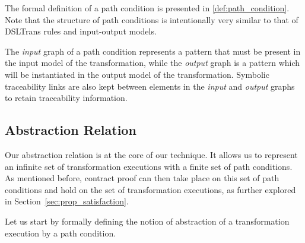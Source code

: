 The formal definition of a path condition is presented in \cref{def:path_condition}. Note that the structure of path conditions is intentionally very similar to that of DSLTrans rules and input-output models.

The \textit{input} graph of a path condition represents a pattern that must be present in the input model of the transformation, while the \textit{output} graph is a pattern which will be instantiated in the output model of the transformation. Symbolic traceability links are also kept between elements in the \textit{input} and \textit{output} graphs to retain traceability information.


\subsection{Abstraction Relation}
\label{subsec:abstraction_relation}

Our abstraction relation is at the core of our technique. It allows us to represent an infinite set of transformation executions with a finite set of path conditions. As mentioned before, contract proof can then take place on this set of path conditions and hold on the set of transformation executions, as further explored in Section~\ref{sec:prop_satisfaction}.

Let us start by formally defining the notion of abstraction of a transformation
execution by a path condition.


